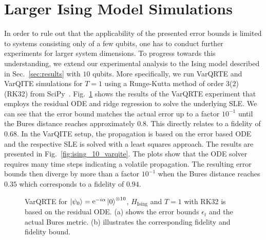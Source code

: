 \documentclass[twocolumn, aps, pra, superscriptaddress]{revtex4-1}
\DeclareMathOperator{\ee}{e}
\begin{document}
\section{Larger Ising Model Simulations}
\label{app:10qubits}
In order to rule out that the applicability of the presented error bounds is limited to systems consisting only of a few qubits, one has to conduct further experiments for larger system dimensions.
To progress towards this understanding, we extend our experimental analysis to the Ising model described in Sec.~\ref{sec:results} with $10$ qubits.
More specifically, we run VarQRTE and VarQITE simulations for $T=1$ using a Runge-Kutta method of order 3(2) (RK32) from SciPy~\cite{2020SciPy-NMeth}.
Fig.~\ref{fig:ising_10_varqrte} shows the results of the VarQRTE experiment that employs the residual ODE and ridge regression to solve the underlying SLE. We can see that the error bound matches the actual error up to a factor $10^{-1}$ until the Bures distance reaches approximately $0.8$. This directly relates to a fidelity of $0.68$.
In the VarQITE setup, the propagation is based on the error based ODE and the respective SLE is solved with a least squares approach. The results are presented in Fig.~\ref{fig:ising_10_varqite}.
The plots show that the ODE solver requires many time steps indicating a volatile propagation. The resulting error bounds then diverge by more than a factor $10^{-1}$ when the Bures distance reaches $0.35$ which corresponds to a fidelity of $0.94$.
\begin{figure}[]
    \centering
    \captionsetup{singlelinecheck = false, format= hang, justification=centerlast, font=footnotesize, labelsep=space}
    \caption{VarQRTE for $\ket{\psi_0}=\ee^{-i\alpha}\ket{0}^{\otimes 10}$, $H_{\text{Ising}}$ and $T=1$ with RK32 is based on the residual ODE. (a) shows the error bounds $\epsilon_t$ and the actual Bures metric. (b) illustrates the corresponding fidelity and fidelity bound.}
    \label{fig:ising_10_varqrte}
\end{figure}
\end{document}
